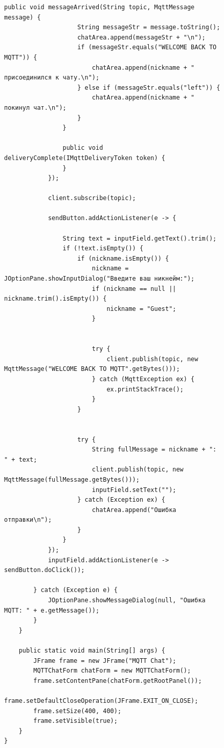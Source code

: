 \documentclass[a4paper, 14pt]{extarticle}
\begin{document}
\begin{figure}[!htb]
\begin{lstlisting}[language={},caption={реализация с swing Ui designer},label={lst:code4}]
                public void messageArrived(String topic, MqttMessage message) {
                    String messageStr = message.toString();
                    chatArea.append(messageStr + "\n");
                    if (messageStr.equals("WELCOME BACK TO MQTT")) {
                        chatArea.append(nickname + " присоединился к чату.\n");
                    } else if (messageStr.equals("left")) {
                        chatArea.append(nickname + " покинул чат.\n");
                    }
                }

                public void deliveryComplete(IMqttDeliveryToken token) {
                }
            });

            client.subscribe(topic);

            sendButton.addActionListener(e -> {

                String text = inputField.getText().trim();
                if (!text.isEmpty()) {
                    if (nickname.isEmpty()) {
                        nickname = JOptionPane.showInputDialog("Введите ваш никнейм:");
                        if (nickname == null || nickname.trim().isEmpty()) {
                            nickname = "Guest";
                        }


                        try {
                            client.publish(topic, new MqttMessage("WELCOME BACK TO MQTT".getBytes()));
                        } catch (MqttException ex) {
                            ex.printStackTrace();
                        }
                    }


                    try {
                        String fullMessage = nickname + ": " + text;
                        client.publish(topic, new MqttMessage(fullMessage.getBytes()));
                        inputField.setText("");
                    } catch (Exception ex) {
                        chatArea.append("Ошибка отправки\n");
                    }
                }
            });
            inputField.addActionListener(e -> sendButton.doClick());

        } catch (Exception e) {
            JOptionPane.showMessageDialog(null, "Ошибка MQTT: " + e.getMessage());
        }
    }

    public static void main(String[] args) {
        JFrame frame = new JFrame("MQTT Chat");
        MQTTChatForm chatForm = new MQTTChatForm();
        frame.setContentPane(chatForm.getRootPanel());
        frame.setDefaultCloseOperation(JFrame.EXIT_ON_CLOSE);
        frame.setSize(400, 400);
        frame.setVisible(true);
    }
}

\end{lstlisting}
\end{figure}
\end{document}
